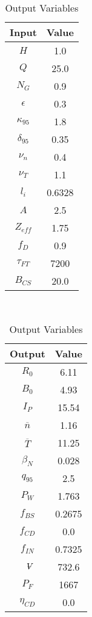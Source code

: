 \begin{table}[h!]
\centering  
\caption{Proteus Variables}
\hfill
\begin{subtable}[t]{0.4\textwidth}
\centering  
\caption{Input Variables} ~\\
\begin{tabular}{ c|c } 

Input            & Value           \\
\hline
$H$              & 1.0              \\
$Q$              & 25.0             \\
$N_{G}$          & 0.9              \\
$\epsilon$       & 0.3              \\
$\kappa_{95}$    & 1.8              \\
$\delta_{95}$    & 0.35             \\
$\nu_{n}$        & 0.4              \\
$\nu_{T}$        & 1.1              \\
$l_{i}$          & 0.6328         \\
$A$              & 2.5              \\
$Z_{eff}$        & 1.75             \\
$f_{D}$          & 0.9              \\
$\tau_{FT}$      & 7200           \\
$B_{CS}$         & 20.0             \\

\end{tabular}
\end{subtable}
\hfill
\begin{subtable}[t]{0.5\textwidth}
\centering  
\caption{Output Variables} ~\\
\begin{tabular}{ c|c } 

Output           & Value       \\
\hline
$R_{0}$          & 6.11             \\
$B_{0}$          & 4.93            \\
$I_{P}$          & 15.54            \\
$\overline n$    & 1.16            \\
$\overline T$    & 11.25            \\
$\beta_{N}$       & 0.028            \\
$q_{95}$         & 2.5              \\
$P_{W}$          & 1.763            \\
$f_{BS}$         & 0.2675           \\
$f_{CD}$         & 0.0              \\
$f_{IN}$         & 0.7325           \\
$\volume$         & 732.6            \\
$P_{F}$          & 1667           \\
$\eta_{CD}$      & 0.0              \\


\end{tabular}
\end{subtable}
\end{table}

